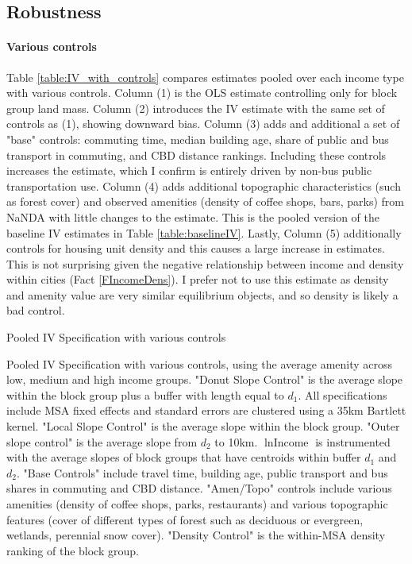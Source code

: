 \documentclass[12pt]{article}
\begin{document}
	
	\clearpage 
	
	\subsection{Robustness} \label{Appendix:EstimateRobustnessOmega}
	
	\paragraph*{Various controls} Table \ref{table:IV_with_controls} compares estimates pooled over each income type with various controls. Column (1) is the OLS estimate controlling only for block group land mass. Column (2) introduces the IV estimate with the same set of controls as (1), showing downward bias. Column (3) adds and additional a set of "base" controls: commuting time, median building age, share of public and bus transport in commuting, and CBD distance rankings. Including these controls increases the estimate, which I confirm is entirely driven by non-bus public transportation use. Column (4) adds additional topographic characteristics (such as forest cover) and observed amenities (density of coffee shops, bars, parks) from NaNDA with little changes to the estimate. This is the pooled version of the baseline IV estimates in Table \ref{table:baselineIV}.  Lastly, Column (5) additionally controls for housing unit density and this causes a large increase in estimates. This is not surprising given the negative relationship between income and density within cities (Fact \ref{FIncomeDens}). I prefer not to use this estimate as density and amenity value are very similar equilibrium objects, and so density is likely a bad control. 
	\begin{table}[htbp]
		\caption{Pooled IV Specification with various controls}\label{table:IV_with_controls}
		\makebox[\textwidth]{}
		\caption*{Pooled IV Specification with various controls, using the average amenity across low, medium and high income groups. "Donut Slope Control" is the average slope within the block group plus a buffer with length equal to $d_{1}$. All specifications include MSA fixed effects and standard errors are clustered using a 35km Bartlett kernel. "Local Slope Control" is the average slope within the block group. "Outer slope control" is the average slope from $d_{2}$ to 10km. $\ln \text{Income}$ is instrumented with the average slopes of block groups that have centroids within buffer $d_{1}$ and $d_{2}$. "Base Controls" include travel time, building age, public transport and bus shares in commuting and CBD distance. "Amen/Topo" controls include various amenities (density of coffee shops, parks, restaurants) and various topographic features (cover of different types of forest such as deciduous or evergreen, wetlands, perennial snow cover). "Density Control" is the within-MSA density ranking of the block group. }
	\end{table}
	
\end{document}
